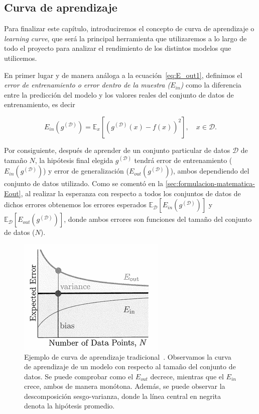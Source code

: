\subsection{Curva de aprendizaje}

Para finalizar este capítulo, introduciremos el concepto de curva de aprendizaje o \emph{learning curve}, que será la principal herramienta que utilizaremos a lo largo de todo el proyecto para analizar el rendimiento de los distintos modelos que utilicemos.\newline

En primer lugar y de manera análoga a la ecuación~\eqref{eq:E_out1}, definimos el \emph{error de entrenamiento o error dentro de la muestra ($E_{in}$)} como la diferencia entre la predicción del modelo y los valores reales del conjunto de datos de entrenamiento, es decir

\begin{equation}\label{eq:E_in1}
    E_{in}(g^{\mathcal{(D)}}) = \mathbb{E}_{x}[{(g^{\mathcal{(D)}}(x) - f(x))}^2], \quad x \in \mathcal{D}.
\end{equation}\newline

Por consiguiente, después de aprender de un conjunto particular de datos $\mathcal{D}$ de tamaño $N$, la hipótesis final elegida $g^{(\mathcal{D})}$ tendrá error de entrenamiento ($E_{in}(g^{(\mathcal{D})})$) y error de generalización ($E_{out}(g^{(\mathcal{D})})$), ambos dependiendo del conjunto de datos utilizado. Como se comentó en la \autoref{sec:formulacion-matematica-Eout}, al realizar la esperanza con respecto a todos los conjuntos de datos de dichos errores obtenemos los errores esperados $\mathbb{E}_{\mathcal{D}}[E_{in}(g^{(\mathcal{D})})]$ y $\mathbb{E}_{\mathcal{D}}[E_{out}(g^{(\mathcal{D})})]$, donde ambos errores son funciones del tamaño del conjunto de datos ($N$).\newline

\begin{figure}[h]
    \centering
    \includegraphics[width=0.4\linewidth]{img/learning-curve.png}
    \caption[Ejemplo de curva de aprendizaje tradicional~\cite{Mostafa2012}.] {Ejemplo de curva de aprendizaje tradicional~\cite{Mostafa2012}. Observamos la curva de aprendizaje de un modelo con respecto al tamaño del conjunto de datos. Se puede comprobar como el $E_{out}$ decrece, mientras que el $E_{in}$ crece, ambos de manera monótona. Además, se puede observar la descomposición sesgo-varianza, donde la línea central en negrita denota la hipótesis promedio.}\label{fig:learning-curve-bias-variance}
\end{figure}

